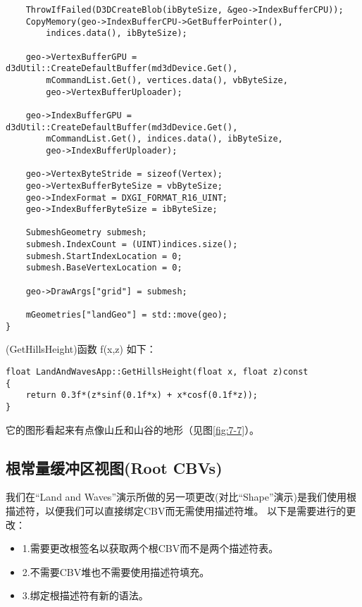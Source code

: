 \begin{lstlisting}
    ThrowIfFailed(D3DCreateBlob(ibByteSize, &geo->IndexBufferCPU));
    CopyMemory(geo->IndexBufferCPU->GetBufferPointer(), 
        indices.data(), ibByteSize);

    geo->VertexBufferGPU = d3dUtil::CreateDefaultBuffer(md3dDevice.Get(),
        mCommandList.Get(), vertices.data(), vbByteSize, 
        geo->VertexBufferUploader);

    geo->IndexBufferGPU = d3dUtil::CreateDefaultBuffer(md3dDevice.Get(),
        mCommandList.Get(), indices.data(), ibByteSize, 
        geo->IndexBufferUploader);

    geo->VertexByteStride = sizeof(Vertex);
    geo->VertexBufferByteSize = vbByteSize;
    geo->IndexFormat = DXGI_FORMAT_R16_UINT;
    geo->IndexBufferByteSize = ibByteSize;

    SubmeshGeometry submesh;
    submesh.IndexCount = (UINT)indices.size();
    submesh.StartIndexLocation = 0;
    submesh.BaseVertexLocation = 0;

    geo->DrawArgs["grid"] = submesh;

    mGeometries["landGeo"] = std::move(geo);
}
\end{lstlisting}

\begin{flushleft}
(GetHillsHeight)函数 f(x,z) 如下：\\
\end{flushleft}

\begin{lstlisting}
float LandAndWavesApp::GetHillsHeight(float x, float z)const
{
    return 0.3f*(z*sinf(0.1f*x) + x*cosf(0.1f*z));
}
\end{lstlisting}

\begin{flushleft}
它的图形看起来有点像山丘和山谷的地形（见图\ref{fig:7-7}）。
\end{flushleft}

\subsection{根常量缓冲区视图(Root CBVs)}
\begin{flushleft}
我们在“Land and Waves”演示所做的另一项更改(对比“Shape”演示)是我们使用根描述符，以便我们可以直接绑定CBV而无需使用描述符堆。 以下是需要进行的更改：\\
\end{flushleft}

\begin{itemize}
  \item 1.需要更改根签名以获取两个根CBV而不是两个描述符表。
  \item 2.不需要CBV堆也不需要使用描述符填充。
  \item 3.绑定根描述符有新的语法。
\end{itemize}

